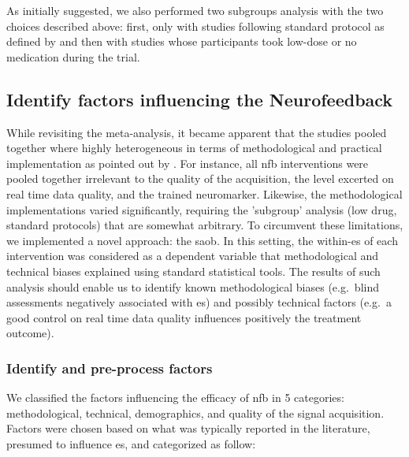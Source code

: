 As initially suggested, we also performed two subgroups analysis with the two choices described above: 
first, only  with studies following standard protocol as defined by \citet{Arns2014} and then with studies 
whose participants took low-dose or no medication during the trial.  

\subsection{Identify factors influencing the Neurofeedback}

While revisiting the meta-analysis, it became apparent that the studies pooled together where highly heterogeneous 
in terms of methodological and practical implementation as pointed out by \citet{Alkoby2017}. For instance, all \gls{nfb} 
interventions were pooled together irrelevant to the quality of the acquisition, the level excerted on real time data 
quality, and the trained neuromarker. Likewise, the methodological implementations varied significantly, requiring the 
'subgroup' analysis (low drug, standard protocols) that are somewhat arbitrary. To circumvent these limitations, we 
implemented a novel approach: the \gls{saob}. In this setting, the within-\gls{es} of each intervention was considered 
as a dependent variable that methodological and technical biases explained using standard statistical tools. The results 
of such analysis should enable us to identify known methodological biases (e.g.\ blind assessments negatively associated 
with \gls{es}) and possibly technical factors (e.g.\ a good control on real time data quality influences positively the 
treatment outcome). 

\subsubsection{Identify and pre-process factors}

We classified the factors influencing the efficacy of \gls{nfb} in 5 categories: methodological, technical,
demographics, and quality of the signal acquisition. 
Factors were chosen based on what was typically reported in the literature, presumed to influence \gls{es}, 
and categorized as follow:

